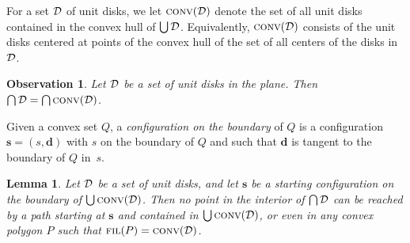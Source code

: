 \documentclass[a4paper]{article}
\newcommand{\DD}{{\cal D}}
\newcommand{\vecs}{{\mathbf{s}}}
\newcommand{\dir}{{\mathbf{d}}}
\DeclareMathOperator{\FIL}{\textsc{fil}}
\DeclareMathOperator{\conv}{\textsc{conv}}
\newtheorem{lemma}[theorem]{Lemma}
\newtheorem{observation}[theorem]{Observation}
\begin{document}
For a set $\DD$ of unit disks, we let $\conv(\DD)$ denote the set of
all unit disks contained in the convex hull of $\bigcup \DD$.
Equivalently, $\conv(\DD)$ consists of the unit disks centered at
points of the convex hull of the set of all centers of the disks in
$\DD$.
\begin{observation}\label{obs:convd}
  \label{l:conv}
  Let $\DD$ be a set of unit disks in the plane. Then $\bigcap \DD =
  \bigcap\conv(\DD)$.
\end{observation}

Given a convex set $Q$, a \emph{configuration on the boundary} of $Q$
is a configuration $\vecs = (s,\dir)$ with $s$ on the boundary of $Q$
and such that $\dir$ is tangent to the boundary of $Q$ in~$s$.
\begin{lemma}\label{l:nonreach}
  Let $\DD$ be a set of unit disks, and let $\vecs$ be a starting
  configuration on the boundary of $\bigcup\conv(\DD)$. Then no point in
  the interior of $\bigcap \DD$ can be reached by a path starting at
  $\vecs$ and contained in $\bigcup\conv(\DD)$, or even in any convex
  polygon $P$ such that $\FIL(P)=\conv(\DD)$.
\end{lemma}
\end{document}
